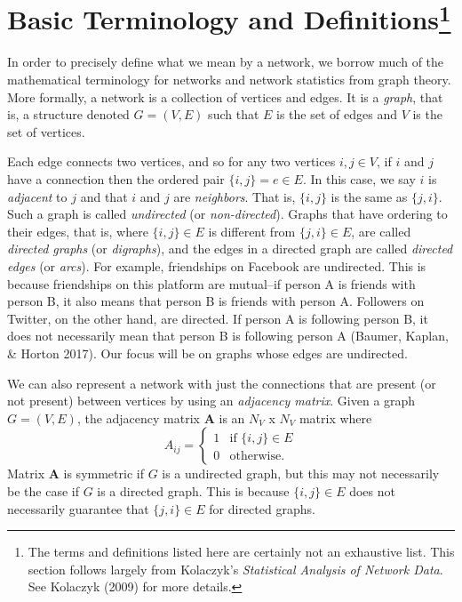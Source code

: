 \documentclass[12pt,twoside]{amherstthesis}
\begin{document}
  \section[Basic Terminology and Definitions]{\texorpdfstring{Basic
  Terminology and Definitions\footnote{The terms and definitions listed
    here are certainly not an exhaustive list. This section follows
    largely from Kolaczyk's \emph{Statistical Analysis of Network Data}.
    See Kolaczyk (2009) for more details.}}{Basic Terminology and Definitions}}\label{basic-terminology-and-definitions-1}
  
  In order to precisely define what we mean by a network, we borrow much
  of the mathematical terminology for networks and network statistics from
  graph theory. More formally, a network is a collection of vertices and
  edges. It is a \emph{graph}, that is, a structure denoted \(G = (V, E)\)
  such that \(E\) is the set of edges and \(V\) is the set of vertices.
  
  Each edge connects two vertices, and so for any two vertices
  \(i, j \in V\), if \(i\) and \(j\) have a connection then the ordered
  pair \(\{i, j\} = e \in E\). In this case, we say \(i\) is
  \emph{adjacent} to \(j\) and that \(i\) and \(j\) are \emph{neighbors}.
  That is, \(\{i, j\}\) is the same as \(\{j, i\}\). Such a graph is
  called \emph{undirected} (or \emph{non-directed}). Graphs that have
  ordering to their edges, that is, where \(\{i, j\} \in E\) is different
  from \(\{j, i\} \in E\), are called \emph{directed graphs} (or
  \emph{digraphs}), and the edges in a directed graph are called
  \emph{directed edges} (or \emph{arcs}). For example, friendships on
  Facebook are undirected. This is because friendships on this platform
  are mutual--if person A is friends with person B, it also means that
  person B is friends with person A. Followers on Twitter, on the other
  hand, are directed. If person A is following person B, it does not
  necessarily mean that person B is following person A (Baumer, Kaplan, \&
  Horton 2017). Our focus will be on graphs whose edges are undirected.
  
  We can also represent a network with just the connections that are
  present (or not present) between vertices by using an \emph{adjacency
  matrix}. Given a graph \(G = (V, E)\), the adjacency matrix
  \(\textbf{A}\) is an \(N_V\) x \(N_V\) matrix where
  \[ A_{ij} = \begin{cases}
      1 & \text{if } \{i, j\} \in E \\
      0 & \text{otherwise.} 
    \end{cases}
  \] Matrix \(\textbf{A}\) is symmetric if \(G\) is a undirected graph,
  but this may not necessarily be the case if \(G\) is a directed graph.
  This is because \(\{i, j\} \in E\) does not necessarily guarantee that
  \(\{j, i\} \in E\) for directed graphs.
  
\end{document}
